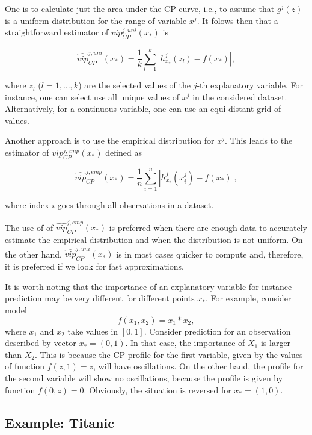 \documentclass[12pt,]{krantz}
\theoremstyle{definition}
\theoremstyle{definition}
\theoremstyle{definition}
\theoremstyle{remark}
\begin{document}
One is to calculate just the area under the CP curve, i.e., to assume
that \(g^j(z)\) is a uniform distribution for the range of variable
\(x^j\). It folows then that a straightforward estimator of
\(vip_{CP}^{j,uni}(x_*)\) is

\begin{equation}
\widehat{vip}_{CP}^{j,uni}(x_*) = \frac 1k \sum_{l=1}^k |h^{j}_{x_*}(z_l) - f(x_*)|,
\label{eq:VIPCPuni}
\end{equation}

where \(z_l\) (\(l=1, \ldots, k\)) are the selected values of the
\(j\)-th explanatory variable. For instance, one can select use all
unique values of \(x^{j}\) in the considered dataset. Alternatively, for
a continuous variable, one can use an equi-distant grid of values.

Another approach is to use the empirical distribution for \(x^{j}\).
This leads to the estimator of \(vip_{CP}^{j,emp}(x_*)\) defined as

\begin{equation}
\widehat{vip}_{CP}^{j,emp}(x_*) = \frac 1n \sum_{i=1}^n |h^{j}_{x_*}(x^{j}_i) - f(x_*)|,
\label{eq:VIPCPemp}
\end{equation}

where index \(i\) goes through all observations in a dataset.

The use of of \(\widehat{vip}_{CP}^{j,emp}(x_*)\) is preferred when
there are enough data to accurately estimate the empirical distribution
and when the distribution is not uniform. On the other hand,
\(\widehat{vip}_{CP}^{j,uni}(x_*)\) is in most cases quicker to compute
and, therefore, it is preferred if we look for fast approximations.

It is worth noting that the importance of an explanatory variable for
instance prediction may be very different for different points \(x_*\).
For example, consider model \[
f(x_1, x_2) = x_1 * x_2,
\] where \(x_1\) and \(x_2\) take values in \([0,1]\). Consider
prediction for an observation described by vector \(x_* = (0,1)\). In
that case, the importance of \(X_1\) is larger than \(X_2\). This is
because the CP profile for the first variable, given by the values of
function \(f(z,1)=z\), will have oscillations. On the other hand, the
profile for the second variable will show no oscillations, because the
profile is given by function \(f(0,z)=0\). Obviously, the situation is
reversed for \(x_*=(1,0)\).

\hypertarget{CPOscExample}{%
\subsection{Example: Titanic}\label{CPOscExample}}
\end{document}
